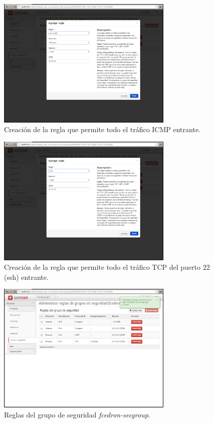 \documentclass{article}
\begin{document}
\begin{figure}[h]
  \centering
    \includegraphics[width=0.75\textwidth]{img/m_031.png}
  \caption{Creación de la regla que permite todo el tráfico ICMP entrante.}
  \label{fig:SecurityGroupRulesICMP}
\end{figure}	

\begin{figure}[h]
  \centering
    \includegraphics[width=0.75\textwidth]{img/m_032.png}
  \caption{Creación de la regla que permite todo el tráfico TCP del puerto 22 (ssh) entrante.}
  \label{fig:SecurityGroupRulesSSH}
\end{figure}	

\begin{figure}[h]
  \centering
    \includegraphics[width=0.75\textwidth]{img/m_033.png}
  \caption{Reglas del grupo de seguridad \emph{fcedron-secgroup}.}
  \label{fig:SecurityGroupRules}
\end{figure}	
\end{document}
